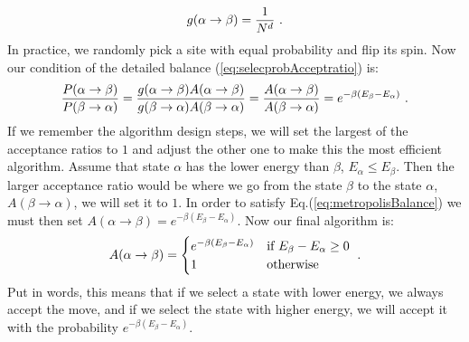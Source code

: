\begin{equation*}
	g(\alpha \rightarrow \beta) = \frac{1}{N^d} \ .
\end{equation*}
In practice, we randomly pick a site with equal probability and flip its spin. Now our condition of the detailed balance (\ref{eq:selecprobAcceptratio}) is:
\begin{equation}
	\frac{P(\alpha \rightarrow \beta)}{P(\beta \rightarrow \alpha)} = \frac{g(\alpha \rightarrow \beta) A(\alpha \rightarrow \beta)}{g(\beta \rightarrow \alpha) A(\beta \rightarrow \alpha)} = \frac{A(\alpha \rightarrow \beta)}{A(\beta \rightarrow \alpha)} = e^{-\beta (E_\beta - E_\alpha)} \ .
	\label{eq:metropolisBalance}
\end{equation}
If we remember the algorithm design steps, we will set the largest of the acceptance ratios to $1$ and adjust the other one to make this the most efficient algorithm. Assume that state $\alpha$ has the lower energy than $\beta$, $E_\alpha \le E_\beta$. Then the larger acceptance ratio would be where we go from the state $\beta$ to the state $\alpha$, $A(\beta \rightarrow \alpha)$, we will set it to $1$. In order to satisfy Eq.(\ref{eq:metropolisBalance}) we must then set $A(\alpha \rightarrow \beta) = e^{-\beta (E_\beta - E_\alpha)}$. Now our final algorithm is:
\begin{equation}
	A(\alpha \rightarrow \beta) = \begin{cases}
		e^{-\beta (E_\beta - E_\alpha)} & \text{if } E_\beta - E_\alpha \ge 0 \\
		1 & \text{otherwise}
	\end{cases} \ .
\end{equation}
Put in words, this means that if we select a state with lower energy, we always accept the move, and if we select the state with higher energy, we will accept it with the probability $e^{-\beta (E_\beta - E_\alpha)}$.
\par
